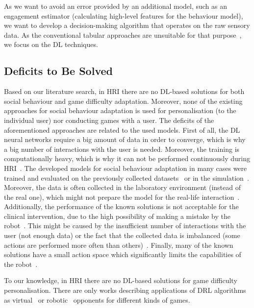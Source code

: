 \documentclass[thesis]{mas_proposal}
\begin{document}
As we want to avoid an error provided by an additional model, such as an engagement estimator (calculating high-level features for the behaviour model), we want to develop a decision-making algorithm that operates on the raw sensory data. As the conventional tabular approaches are unsuitable for that purpose~\cite{akalin2021reinforcement}, we focus on the DL techniques.

\subsection{Deficits to Be Solved}
Based on our literature search, in HRI there are no DL-based solutions for both social behaviour and game difficulty adaptation. Moreover, none of the existing approaches for social behaviour adaptation is used for personalisation (to the individual user) nor conducting games with a user. The deficits of the aforementioned approaches are related to the used models. First of all, the DL neural networks require a big amount of data in order to converge, which is why a big number of interactions with the user is needed. Moreover, the training is computationally heavy, which is why it can not be performed continuously during HRI~\cite{Qureshi2016,Qureshi2017,Qureshi2018,Romeo2019}. The developed models for social behaviour adaptation in many cases were trained and evaluated on the previously collected datasets~\cite{ClarkTurner2017,Romeo2018,Hijaz2021} or in the simulation~\cite{Turner2018,Belo2021,Belo2022}. Moreover, the data is often collected in the laboratory environment (instead of the real one), which might not prepare the model for the real-life interaction~\cite{ClarkTurner2017,Turner2018,Romeo2018}. Additionally, the performance of the known solutions is not acceptable for the clinical intervention, due to the high possibility of making a mistake by the robot~\cite{ClarkTurner2017,Turner2018,Romeo2019,Hijaz2021}. This might be caused by the insufficient number of interactions with the user (not enough data) or the fact that the collected data is imbalanced (some actions are performed more often than others)~\cite{Hijaz2021}. Finally, many of the known solutions have a small action space which significantly limits the capabilities of the robot~\cite{Qureshi2016,Qureshi2017,Qureshi2018,ClarkTurner2017,Turner2018,Belo2021,Belo2022,Romeo2018,Romeo2019}.

To our knowledge, in HRI there are no DL-based solutions for game difficulty personalisation. There are only works describing applications of DRL algorithms as virtual~\cite{mnih2015human,hausknecht2015deep,sorokin2015deep} or robotic~\cite{Cuayahuitl2017,Cuayahuitl2020} opponents for different kinds of games.
\end{document}
